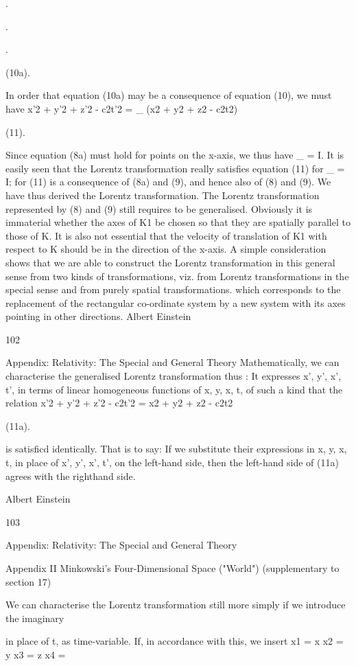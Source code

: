 \documentclass{article}
\begin{document}
.

.

.

(10a).

In order that equation (10a) may be a consequence of equation (10), we must have
x'2 + y'2 + z'2 - c2t'2 = \_ (x2 + y2 + z2 - c2t2)

(11).

Since equation (8a) must hold for points on the x-axis, we thus have \_ = I. It is easily
seen that the Lorentz transformation really satisfies equation (11) for \_ = I; for (11) is a
consequence of (8a) and (9), and hence also of (8) and (9). We have thus derived the
Lorentz transformation.
The Lorentz transformation represented by (8) and (9) still requires to be generalised.
Obviously it is immaterial whether the axes of K1 be chosen so that they are spatially
parallel to those of K. It is also not essential that the velocity of translation of K1 with
respect to K should be in the direction of the x-axis. A simple consideration shows that we
are able to construct the Lorentz transformation in this general sense from two kinds of
transformations, viz. from Lorentz transformations in the special sense and from purely
spatial transformations. which corresponds to the replacement of the rectangular co-ordinate
system by a new system with its axes pointing in other directions.
Albert Einstein

102

Appendix: Relativity: The Special and General Theory
Mathematically, we can characterise the generalised Lorentz transformation thus :
It expresses x', y', x', t', in terms of linear homogeneous
functions of x, y, x, t, of such a kind that the relation
x'2 + y'2 + z'2 - c2t'2 = x2 + y2 + z2 - c2t2

(11a).

is satisficd identically. That is to say: If we substitute their expressions in x, y, x, t, in place
of x', y', x', t', on the left-hand side, then the left-hand side of (11a) agrees with the righthand side.

Albert Einstein

103

Appendix: Relativity: The Special and General Theory

Appendix II
Minkowski's Four-Dimensional Space ("World")
(supplementary to section 17)

We can characterise the Lorentz transformation still more simply if we introduce the
imaginary

in place of t, as time-variable. If, in accordance with this, we insert
x1 = x
x2 = y
x3 = z
x4 =
\end{document}
